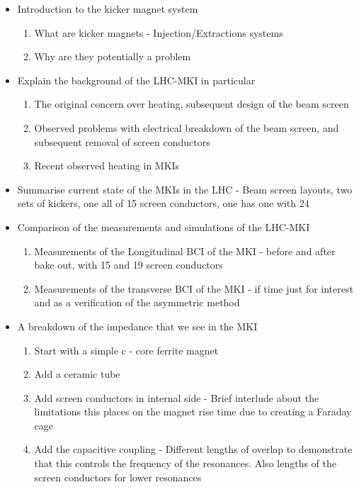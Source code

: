 \begin{itemize}
\item{Introduction to the kicker magnet system}                                                                                                                                                                                                                                                                                                             
\begin{enumerate}
\item{What are kicker magnets - Injection/Extractions systems}
\item{Why are they potentially a problem}
\end{enumerate}
\item{Explain the background of the LHC-MKI in particular}
\begin{enumerate}
\item{The original concern over heating, subsequent design of the beam screen}
\item{Observed problems with electrical breakdown of the beam screen, and subsequent removal of screen conductors}
\item{Recent observed heating in MKIs}
\end{enumerate}
\item{Summarise current state of the MKIs in the LHC - Beam screen layouts, two sets of kickers, one all of 15 screen conductors, one has one with 24}
\item{Comparison of the measurements and simulations of the LHC-MKI}
\begin{enumerate}
\item{Measurements of the Longitudinal BCI of the MKI - before and after bake out, with 15 and 19 screen conductors}
\item{Measurements of the transverse BCI of the MKI - if time just for interest and as a verification of the asymmetric method}
\end{enumerate}
\item{A breakdown of the impedance that we see in the MKI}
\begin{enumerate}
\item{Start with a simple c - core ferrite magnet}
\item{Add a ceramic tube}
\item{Add screen conductors in internal side - Brief interlude about the limitations this places on the magnet rise time due to creating a Faraday cage}
\item{Add the capacitive coupling - Different lengths of overlap to demonstrate that this controls the frequency of the resonances. Also lengths of the screen conductors for lower resonances}

\end{enumerate}
\end{itemize}
